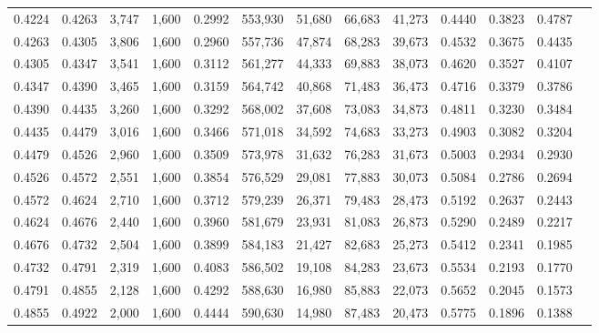 \begin{tabular}{rrrrrrrrrrrrr}
0.4224 & 0.4263 &  3,747 & 1,600 &                                     0.2992 & 553,930 &  51,680 &  66,683 &  41,273 & 0.4440 & 0.3823 & 0.4787 \\
0.4263 & 0.4305 &  3,806 & 1,600 &                                     0.2960 & 557,736 &  47,874 &  68,283 &  39,673 & 0.4532 & 0.3675 & 0.4435 \\
0.4305 & 0.4347 &  3,541 & 1,600 &                                     0.3112 & 561,277 &  44,333 &  69,883 &  38,073 & 0.4620 & 0.3527 & 0.4107 \\
0.4347 & 0.4390 &  3,465 & 1,600 &                                     0.3159 & 564,742 &  40,868 &  71,483 &  36,473 & 0.4716 & 0.3379 & 0.3786 \\
0.4390 & 0.4435 &  3,260 & 1,600 &                                     0.3292 & 568,002 &  37,608 &  73,083 &  34,873 & 0.4811 & 0.3230 & 0.3484 \\
0.4435 & 0.4479 &  3,016 & 1,600 &                                     0.3466 & 571,018 &  34,592 &  74,683 &  33,273 & 0.4903 & 0.3082 & 0.3204 \\
0.4479 & 0.4526 &  2,960 & 1,600 &                                     0.3509 & 573,978 &  31,632 &  76,283 &  31,673 & 0.5003 & 0.2934 & 0.2930 \\
0.4526 & 0.4572 &  2,551 & 1,600 &                                     0.3854 & 576,529 &  29,081 &  77,883 &  30,073 & 0.5084 & 0.2786 & 0.2694 \\
0.4572 & 0.4624 &  2,710 & 1,600 &                                     0.3712 & 579,239 &  26,371 &  79,483 &  28,473 & 0.5192 & 0.2637 & 0.2443 \\
0.4624 & 0.4676 &  2,440 & 1,600 &                                     0.3960 & 581,679 &  23,931 &  81,083 &  26,873 & 0.5290 & 0.2489 & 0.2217 \\
0.4676 & 0.4732 &  2,504 & 1,600 &                                     0.3899 & 584,183 &  21,427 &  82,683 &  25,273 & 0.5412 & 0.2341 & 0.1985 \\
0.4732 & 0.4791 &  2,319 & 1,600 &                                     0.4083 & 586,502 &  19,108 &  84,283 &  23,673 & 0.5534 & 0.2193 & 0.1770 \\
0.4791 & 0.4855 &  2,128 & 1,600 &                                     0.4292 & 588,630 &  16,980 &  85,883 &  22,073 & 0.5652 & 0.2045 & 0.1573 \\
0.4855 & 0.4922 &  2,000 & 1,600 &                                     0.4444 & 590,630 &  14,980 &  87,483 &  20,473 & 0.5775 & 0.1896 & 0.1388 \\

\end{tabular}
